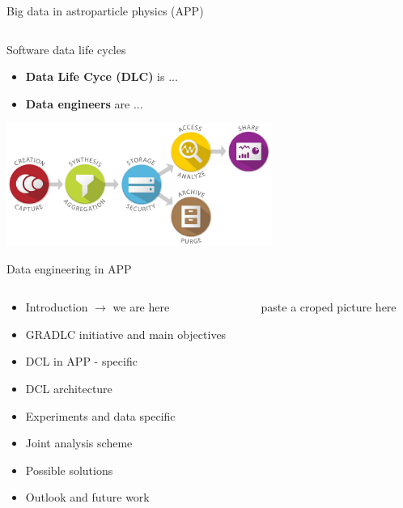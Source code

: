 \begin{frame}{Big data in astroparticle physics (APP)}
\begin{columns}
\begin{column}[t]{0.42\textwidth}
  \end{column}
\end{columns}
  \footnotesize{}
\end{frame}

\begin{frame}{Software data life cycles}%
\begin{itemize}
\item \textbf{Data Life Cyce (DLC)} is ...
\item \textbf{Data engineers} are ...
\end{itemize}

\vspace{-1ex}
\centering
\includegraphics[width=0.65\textwidth]{pics/data_lifecycle_illust.jpg}
\end{frame}

\begin{frame}{Data engineering in APP}

\begin{columns}
    \begin{column}[t]{5cm}
        \begin{itemize}
        \item  Introduction \textcolor{kit-green100}{$\rightarrow$ we are here}
        \item  GRADLC initiative and main objectives
        \item  DCL in APP - specific
        \item  DCL architecture
        \item  Experiments and data specific
        \item  Joint analysis scheme
        \item  Possible solutions
        \item  Outlook and future work
        \end{itemize}
    \end{column}

    \begin{column}[t]{5cm}
    paste a croped picture here
    \end{column}
    \end{columns}
\end{frame}

